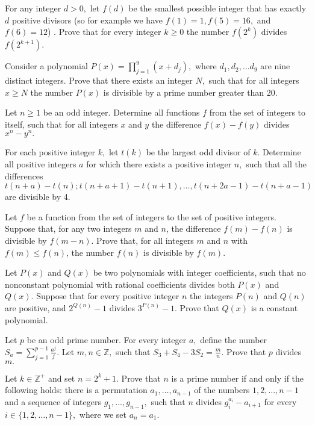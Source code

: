 \item[\textbf{N1.}]
For any integer 
$d > 0,$
 let 
$f(d)$
 be the smallest possible integer that has exactly 
$d$
 positive divisors (so for example we have 
$f(1)=1, f(5)=16,$
 and 
$f(6)=12$)
. Prove that for every integer 
$k \geq 0$
 the number 
$f\left(2^k\right)$
 divides 
$f\left(2^{k+1}\right).$

\item[\textbf{N2.}]
Consider a polynomial 
$P(x) =  \prod^9_{j=1}(x+d_j),$
 where 
$d_1, d_2, \ldots d_9$
 are nine distinct integers. Prove that there exists an integer 
$N,$
 such that for all integers 
$x \geq N$
 the number 
$P(x)$
 is divisible by a prime number greater than 20.

\item[\textbf{N3.}]
Let 
$n \geq 1$
 be an odd integer. Determine all functions 
$f$
 from the set of integers to itself, such that for all integers 
$x$
 and 
$y$
 the difference 
$f(x)-f(y)$
 divides 
$x^n-y^n.$

\item[\textbf{N4.}]
For each positive integer 
$k,$
 let 
$t(k)$
 be the largest odd divisor of 
$k.$
 Determine all positive integers 
$a$
 for which there exists a positive integer 
$n,$
 such that all the differences
\[t(n+a)-t(n); t(n+a+1)-t(n+1), \ldots, t(n+2a-1)-t(n+a-1)\]
 are divisible by 4.

\item[\textbf{N5.}]
Let 
$f$
 be a function from the set of integers to the set of positive integers. Suppose that, for any two integers 
$m$
 and 
$n$, 
 the difference 
$f(m) - f(n)$
 is divisible by 
$f(m- n)$.
 Prove that, for all integers 
$m$
 and 
$n$
 with 
$f(m) \leq f(n)$, 
 the number 
$f(n)$
 is divisible by 
$f(m)$.

\item[\textbf{N6.}]
Let 
$P(x)$
 and 
$Q(x)$
 be two polynomials with integer coefficients, such that no nonconstant polynomial with rational coefficients divides both 
$P(x)$
 and 
$Q(x).$
 Suppose that for every positive integer 
$n$
 the integers 
$P(n)$
 and 
$Q(n)$
 are positive, and 
$2^{Q(n)}-1$
 divides 
$3^{P(n)}-1.$
 Prove that 
$Q(x)$
 is a constant polynomial.

\item[\textbf{N7.}]
Let 
$p$
 be an odd prime number. For every integer 
$a,$
 define the number 
$S_a = \sum^{p-1}_{j=1} \frac{a^j}{j}.$
 Let 
$m,n \in \mathbb{Z},$
 such that 
$S_3 + S_4 - 3S_2 = \frac{m}{n}.$
 Prove that 
$p$
 divides 
$m.$

\item[\textbf{N8.}]
Let 
$k \in \mathbb{Z}^+$
 and set 
$n=2^k+1.$
 Prove that 
$n$
 is a prime number if and only if the following holds: there is a permutation 
$a_{1},\ldots,a_{n-1}$
 of the numbers 
$1,2, \ldots, n-1$
 and a sequence of integers 
$g_{1},\ldots,g_{n-1},$
 such that 
$n$
 divides 
$g^{a_i}_i - a_{i+1}$
 for every 
$i \in \{1,2,\ldots,n-1\},$
 where we set 
$a_n = a_1.$
